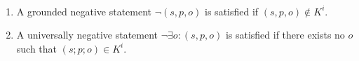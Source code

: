 \begin{defn} \mbox{ }
\begin{enumerate}[noitemsep,topsep=0pt,parsep=0pt,partopsep=0pt]
\item A grounded negative statement $\neg (s, p, o)$ is satisfied if $(s, p, o) \notin K^i$.
\item A universally  negative statement $\neg\exists o: (s, p, o)$ is satisfied if there exists no $o$ such that $(s; p; o) \in K^i$.
\end{enumerate} 
\end{defn}




